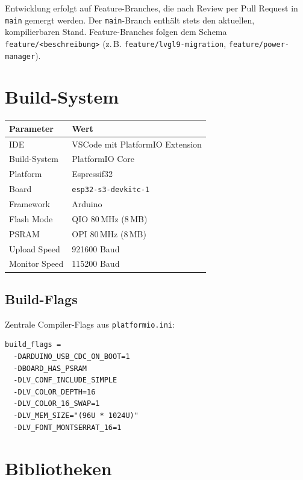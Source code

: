 \documentclass[a4paper,11pt]{article}
\begin{document}
Entwicklung erfolgt auf Feature-Branches, die nach Review per Pull Request in \texttt{main} gemergt werden. Der \texttt{main}-Branch enthält stets den aktuellen, kompilierbaren Stand. Feature-Branches folgen dem Schema \texttt{feature/<beschreibung>} (z.\,B. \texttt{feature/lvgl9-migration}, \texttt{feature/power-manager}).

\section{Build-System}

\begin{tabularx}{\textwidth}{lX}
\toprule
\rowcolor{tableheader}
\textbf{Parameter} & \textbf{Wert} \\
\midrule
IDE & VSCode mit PlatformIO Extension \\
Build-System & PlatformIO Core \\
Platform & Espressif32 \\
Board & \texttt{esp32-s3-devkitc-1} \\
Framework & Arduino \\
Flash Mode & QIO 80\,MHz (8\,MB) \\
PSRAM & OPI 80\,MHz (8\,MB) \\
Upload Speed & 921600 Baud \\
Monitor Speed & 115200 Baud \\
\bottomrule
\end{tabularx}

\subsection{Build-Flags}

Zentrale Compiler-Flags aus \texttt{platformio.ini}:

\begin{lstlisting}
build_flags =
  -DARDUINO_USB_CDC_ON_BOOT=1
  -DBOARD_HAS_PSRAM
  -DLV_CONF_INCLUDE_SIMPLE
  -DLV_COLOR_DEPTH=16
  -DLV_COLOR_16_SWAP=1
  -DLV_MEM_SIZE="(96U * 1024U)"
  -DLV_FONT_MONTSERRAT_16=1
\end{lstlisting}

\section{Bibliotheken}
\end{document}
